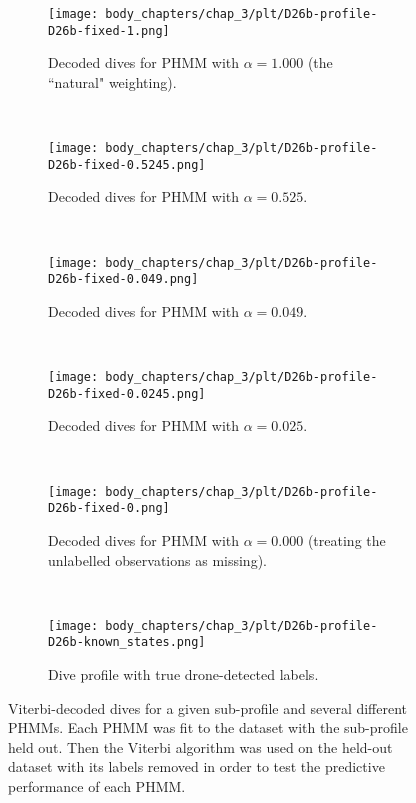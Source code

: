 \begin{figure}[H]
    \centering
    \begin{subfigure}[t]{0.45\textwidth}
        \centering
        \texttt{[image: body\_chapters/chap\_3/plt/D26b-profile-D26b-fixed-1.png]}
        \caption{Decoded dives for PHMM with $\alpha = 1.000$ (the ``natural" weighting).}
    \end{subfigure}
    ~ 
    \begin{subfigure}[t]{0.45\textwidth}
        \centering
        \texttt{[image: body\_chapters/chap\_3/plt/D26b-profile-D26b-fixed-0.5245.png]}
        \caption{Decoded dives for PHMM with $\alpha = 0.525$.}
    \end{subfigure}
    \\
    \begin{subfigure}[t]{0.45\textwidth}
        \centering
        \texttt{[image: body\_chapters/chap\_3/plt/D26b-profile-D26b-fixed-0.049.png]}
        \caption{Decoded dives for PHMM with $\alpha = 0.049$.}
    \end{subfigure}
    ~
    \begin{subfigure}[t]{0.45\textwidth}
        \centering
        \texttt{[image: body\_chapters/chap\_3/plt/D26b-profile-D26b-fixed-0.0245.png]}
        \caption{Decoded dives for PHMM with $\alpha = 0.025$.}
    \end{subfigure}
    \\
    \begin{subfigure}[t]{0.45\textwidth}
        \centering
        \texttt{[image: body\_chapters/chap\_3/plt/D26b-profile-D26b-fixed-0.png]}
        \caption{Decoded dives for PHMM with $\alpha = 0.000$ (treating the unlabelled observations as missing).}
    \end{subfigure}
    ~
    \begin{subfigure}[t]{0.45\textwidth}
        \centering
        \texttt{[image: body\_chapters/chap\_3/plt/D26b-profile-D26b-known\_states.png]}
        \caption{Dive profile with true drone-detected labels.}
    \end{subfigure}
    \caption[Viterbi-decoded dives for a given sub-profile and several different PHMMs.]{Viterbi-decoded dives for a given sub-profile and several different PHMMs. Each PHMM was fit to the dataset with the sub-profile held out. Then the Viterbi algorithm was used on the held-out dataset with its labels removed in order to test the predictive performance of each PHMM.}
    \label{fig:viterbi_dives_D26b_app}
\end{figure}